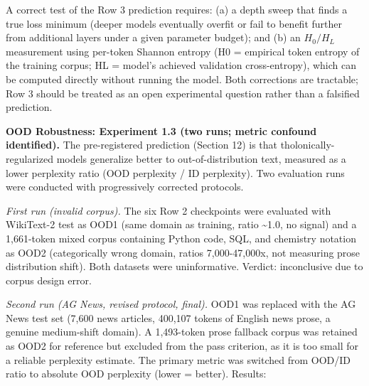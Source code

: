 \documentclass[12pt]{article}
\begin{document}
A correct test of the Row 3 prediction requires: (a) a depth sweep that
finds a true loss minimum (deeper models eventually overfit or fail to
benefit further from additional layers under a given parameter budget);
and (b) an \(H_0/H_L\) measurement using per-token Shannon entropy (H0 =
empirical token entropy of the training corpus; HL = model's achieved
validation cross-entropy), which can be computed directly without
running the model. Both corrections are tractable; Row 3 should be
treated as an open experimental question rather than a falsified
prediction.

\textbf{OOD Robustness: Experiment 1.3 (two runs; metric confound
identified).} The pre-registered prediction (Section 12) is that
tholonically-regularized models generalize better to out-of-distribution
text, measured as a lower perplexity ratio (OOD perplexity / ID
perplexity). Two evaluation runs were conducted with progressively
corrected protocols.

\emph{First run (invalid corpus).} The six Row 2 checkpoints were
evaluated with WikiText-2 test as OOD1 (same domain as training, ratio
\textasciitilde1.0, no signal) and a 1,661-token mixed corpus containing
Python code, SQL, and chemistry notation as OOD2 (categorically wrong
domain, ratios 7,000-47,000x, not measuring prose distribution shift).
Both datasets were uninformative. Verdict: inconclusive due to corpus
design error.

\emph{Second run (AG News, revised protocol, final).} OOD1 was replaced
with the AG News test set (7,600 news articles, 400,107 tokens of
English news prose, a genuine medium-shift domain). A 1,493-token prose
fallback corpus was retained as OOD2 for reference but excluded from the
pass criterion, as it is too small for a reliable perplexity estimate.
The primary metric was switched from OOD/ID ratio to absolute OOD
perplexity (lower = better). Results:
\end{document}
